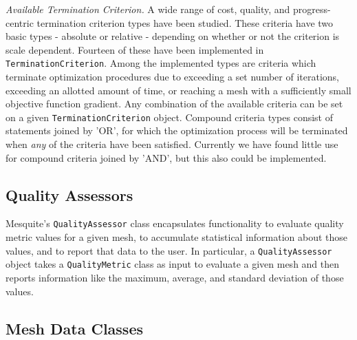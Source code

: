 \documentclass[psfig]{article}
\begin{document}
{\it Available Termination Criterion.}  A wide range of cost, quality, 
and progress-centric termination
criterion types have been studied. These criteria have two basic types - 
absolute or relative - depending on whether or not the criterion is scale 
dependent.  Fourteen of these have been
implemented in \texttt{TerminationCriterion}.  Among the implemented
types are criteria which terminate optimization procedures due to
exceeding a set number of iterations, exceeding an allotted amount of
time, or reaching a mesh with a sufficiently small objective function
gradient.  Any combination of the available criteria can be set on a given
\texttt{TerminationCriterion} object.  Compound criteria types consist
of statements joined by 'OR', for which 
the optimization process will be terminated when {\it any} of
the criteria have been satisfied.  Currently we have found little use
for compound criteria joined by 'AND', but this also could be implemented. 

\subsection{Quality Assessors}

Mesquite's \texttt{QualityAssessor} class encapsulates functionality to
evaluate quality metric values for a given mesh, to accumulate
statistical information about those values, and to report that data to
the user.  In particular, a \texttt{QualityAssessor} object takes a
{\tt QualityMetric} class as input to evaluate a given mesh and then
reports information like the maximum, average, and standard deviation
of those values.


\subsection{Mesh Data Classes} \label{sec:MeshData}
\end{document}

